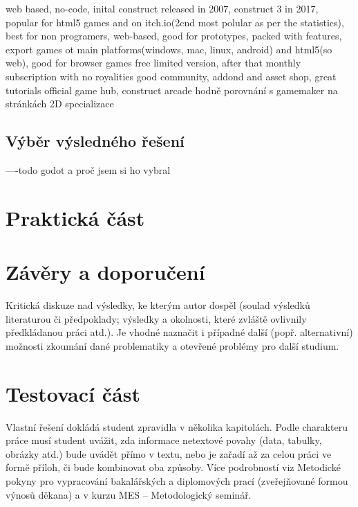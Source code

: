 web based, no-code, inital construct released in 2007, construct 3 in 2017, popular for html5 games and on itch.io(2cnd most polular as per the statistics\cite{itch_io_engines}),
best for non programers, web-based, good for prototypes, packed with features, export games ot main platforms(windows, mac, linux, android) and html5(so web), good for browser games
free limited version, after that monthly subscription with no royalities
good community, addond and asset shop, great tutorials
official game hub, construct arcade
hodně porovnání s gamemaker na stránkách
2D specializace


\subsection{Výběr výsledného řešení}
----todo \linebreak godot a proč jsem si ho vybral


\section{Praktická část}



\section{Závěry a doporučení}


Kritická diskuze nad výsledky, ke kterým autor dospěl (soulad výsledků  literaturou či předpoklady;
výsledky a okolnosti, které zvláště ovlivnily předkládanou práci atd.). Je vhodné naznačit i případné další
(popř. alternativní) možnosti zkoumání dané problematiky a otevřené problémy pro další studium.

\section{Testovací část}


Vlastní řešení dokládá student zpravidla v několika kapitolách. Podle charakteru práce musí student uvážit, zda informace
netextové povahy (data, tabulky, obrázky atd.) bude uvádět přímo v textu, nebo je zařadí až za celou práci ve formě příloh, či bude kombinovat oba způsoby.
Více podrobností viz Metodické pokyny pro vypracování bakalářských a diplomových prací (zveřejňované formou výnosů děkana)
a v kurzu MES – Metodologický seminář.

